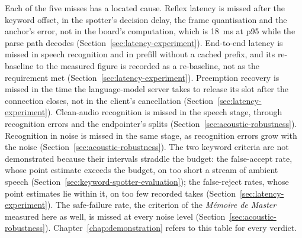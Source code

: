 

Each of the five misses has a located cause. Reflex latency is missed after the keyword offset,
in the spotter's decision delay, the frame quantisation and the anchor's error, not in the board's
computation, which is 18~ms at p95 while the parse path decodes (Section~\ref{sec:latency-experiment}). End-to-end latency is missed in speech
recognition and in prefill without a cached prefix, and its re-baseline to the measured figure is
recorded as a re-baseline, not as the requirement met (Section~\ref{sec:latency-experiment}).
Preemption recovery is missed in the time the language-model server takes to release its slot after
the connection closes, not in the client's cancellation (Section~\ref{sec:latency-experiment}).
Clean-audio recognition is missed in the speech stage, through recognition errors and the
endpointer's splits (Section~\ref{sec:acoustic-robustness}). Recognition in noise is missed in the
same stage, as recognition errors grow with the noise (Section~\ref{sec:acoustic-robustness}).
The two keyword criteria are not demonstrated because their intervals straddle the budget: the
false-accept rate, whose point estimate exceeds the budget, on too short a stream of ambient speech
(Section~\ref{sec:keyword-spotter-evaluation}); the false-reject rates, whose point estimates
lie within it, on too few recorded takes (Section~\ref{sec:latency-experiment}). The safe-failure
rate, the criterion of the \emph{M\'emoire de Master} measured here as well, is missed at every
noise level (Section~\ref{sec:acoustic-robustness}). Chapter~\ref{chap:demonstration} refers to this
table for every verdict.